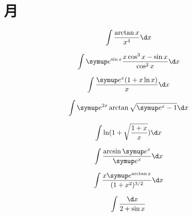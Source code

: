 \section{月}

\begin{question}
    \begin{equation*}
        \int\frac{\arctan x}{x^4} \d x
    \end{equation*}
\end{question}

\begin{question}
    \begin{equation*}
        \int \me^{ \sin x } \frac{ x \cos^3 x - \sin x }{ \cos^2 x } \d x
    \end{equation*}
\end{question}

\begin{question}
    \begin{equation*}
        \int \frac{ \me^x ( 1 + x \ln x ) }{ x } \d x
    \end{equation*}
\end{question}

\begin{question}
    \begin{equation*}
        \int \me^{2x} \arctan \sqrt{ \me^x - 1 } \d x
    \end{equation*}
\end{question}

\begin{question}
    \begin{equation*}
        \int \ln(1 + \sqrt{\frac{1 + x}{x}}) \d x
    \end{equation*}
\end{question}

\begin{question}
    \begin{equation*}
        \int \frac{\arcsin \me^x}{\me^x} \d x
    \end{equation*}
\end{question}

\begin{question}
    \begin{equation*}
        \int \frac{x \me^{\arctan x}}{(1 + x^2)^{3/2}} \d x
    \end{equation*}
\end{question}

\begin{question}
    \begin{equation*}
        \int \frac{\d x}{2 + \sin x}
    \end{equation*}
\end{question}


